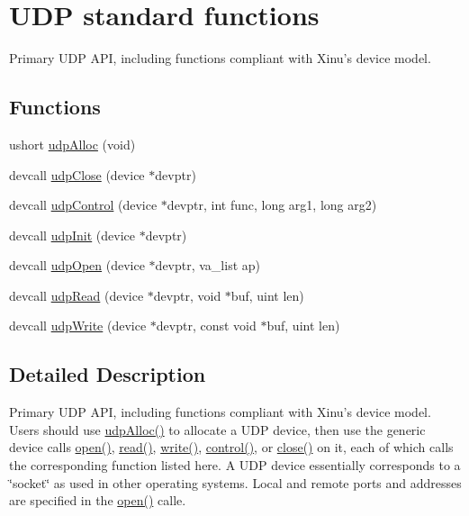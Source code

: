 \hypertarget{group__udpexternal}{\section{U\-D\-P standard functions}
\label{group__udpexternal}
}


Primary U\-D\-P A\-P\-I, including functions compliant with Xinu's device model.  


\subsection*{Functions}
\begin{DoxyCompactItemize}
\item 
ushort \hyperlink{group__udpexternal_gabcbf39c9ecabbf6066fff987c50c7db1}{udp\-Alloc} (void)
\item 
devcall \hyperlink{group__udpexternal_ga4b9a2995c6470acb368863cb0c467921}{udp\-Close} (device $\ast$devptr)
\item 
devcall \hyperlink{group__udpexternal_ga19a687321da86a127c08eb51ed7d3b0a}{udp\-Control} (device $\ast$devptr, int func, long arg1, long arg2)
\item 
devcall \hyperlink{group__udpexternal_gae5b3e1ee3e3d286f70482aa26831af45}{udp\-Init} (device $\ast$devptr)
\item 
devcall \hyperlink{group__udpexternal_ga145b34934ec681c09c5d32083c7f769d}{udp\-Open} (device $\ast$devptr, va\-\_\-list ap)
\item 
devcall \hyperlink{group__udpexternal_gadab18aa82e8854f5a53051ab0ed2c665}{udp\-Read} (device $\ast$devptr, void $\ast$buf, uint len)
\item 
devcall \hyperlink{group__udpexternal_gaf42df1179176ea560a6101b7741cfe1d}{udp\-Write} (device $\ast$devptr, const void $\ast$buf, uint len)
\end{DoxyCompactItemize}


\subsection{Detailed Description}
Primary U\-D\-P A\-P\-I, including functions compliant with Xinu's device model. Users should use \hyperlink{group__udpexternal_gabcbf39c9ecabbf6066fff987c50c7db1}{udp\-Alloc()} to allocate a U\-D\-P device, then use the generic device calls \hyperlink{group__devcalls_ga1eba5ef52c39e4c1d412e31cd03d4d2c}{open()}, \hyperlink{group__devcalls_ga743e9d7e0afd7a1eb0c4321e79bc30a3}{read()}, \hyperlink{group__devcalls_ga400d1061c614113f32fc30ce80c85a98}{write()}, \hyperlink{group__devcalls_ga24e6838ad3f08cdb319118280033a9d5}{control()}, or \hyperlink{group__devcalls_ga67013cfade639dcd90764203bfdb4656}{close()} on it, each of which calls the corresponding function listed here. A U\-D\-P device essentially corresponds to a \char`\"{}socket\char`\"{} as used in other operating systems. Local and remote ports and addresses are specified in the \hyperlink{group__devcalls_ga1eba5ef52c39e4c1d412e31cd03d4d2c}{open()} calle. 

